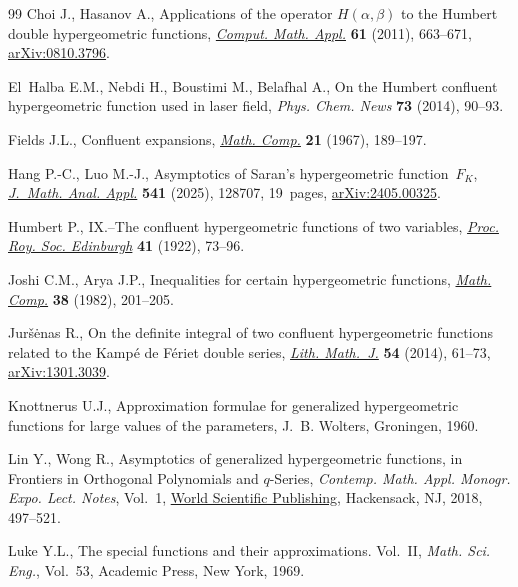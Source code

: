 \begin{thebibliography}{99}
Choi J., Hasanov A., Applications of the operator {$H(\alpha,\beta)$} to the
 {H}umbert double hypergeometric functions, \href{https://doi.org/10.1016/j.camwa.2010.12.012}{\textit{Comput. Math. Appl.}}
 \textbf{61} (2011), 663--671, \href{https://arxiv.org/abs/0810.3796}{arXiv:0810.3796}.

El~Halba E.M., Nebdi H., Boustimi M., Belafhal A., On the {H}umbert confluent
 hypergeometric function used in laser field, \textit{Phys. Chem. News}
 \textbf{73} (2014), 90--93.

Fields J.L., Confluent expansions, \href{https://doi.org/10.2307/2004159}{\textit{Math. Comp.}} \textbf{21} (1967),
 189--197.

Hang P.-C., Luo M.-J., Asymptotics of {S}aran's hypergeometric function~$F_K$,
 \href{https://doi.org/10.1016/j.jmaa.2024.128707}{\textit{J.~Math. Anal. Appl.}} \textbf{541} (2025), 128707, 19~pages,
 \href{https://arxiv.org/abs/2405.00325}{arXiv:2405.00325}.

Humbert P., {IX}.--{T}he confluent hypergeometric functions of two variables,
 \href{https://doi.org/10.1017/S0370164600009810}{\textit{Proc. Roy. Soc. Edinburgh}} \textbf{41} (1922), 73--96.

Joshi C.M., Arya J.P., Inequalities for certain hypergeometric functions,
 \href{https://doi.org/10.2307/2007475}{\textit{Math. Comp.}} \textbf{38} (1982), 201--205.

Jur\v{s}\.enas R., On the definite integral of two confluent hypergeometric
 functions related to the {K}amp\'e de {F}\'eriet double series, \href{https://doi.org/10.1007/s10986-014-9227-y}{\textit{Lith.
 Math.~J.}} \textbf{54} (2014), 61--73, \href{https://arxiv.org/abs/1301.3039}{arXiv:1301.3039}.

Knottnerus U.J., Approximation formulae for generalized hypergeometric
 functions for large values of the parameters, J.~B. Wolters, Groningen, 1960.

Lin Y., Wong R., Asymptotics of generalized hypergeometric functions, in
 Frontiers in Orthogonal Polynomials and {$q$}-Series, \textit{Contemp. Math.
 Appl. Monogr. Expo. Lect. Notes}, Vol.~1, \href{https://doi.org/10.1142/9789813228887_0025}{World Scientific Publishing},
 Hackensack, NJ, 2018, 497--521.

Luke Y.L., The special functions and their approximations. {V}ol.~{II},
 \textit{Math. Sci. Eng.}, Vol.~53, Academic Press, New York, 1969.


\end{thebibliography}

